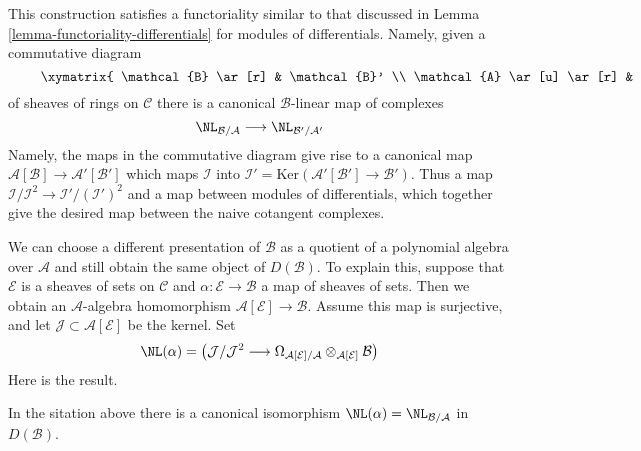 \noindent
This construction satisfies a functoriality similar to that discussed
in Lemma \ref{lemma-functoriality-differentials} for modules of differentials.
Namely, given a commutative diagram
\begin{equation}
\label{equation-commutative-square-sheaves}
\vcenter{
\xymatrix{
\mathcal{B} \ar[r] & \mathcal{B}' \\
\mathcal{A} \ar[u] \ar[r] & \mathcal{A}' \ar[u]
}
}
\end{equation}
of sheaves of rings on $\mathcal{C}$ there is a canonical
$\mathcal{B}$-linear map of complexes
$$
\NL_{\mathcal{B}/\mathcal{A}} \longrightarrow \NL_{\mathcal{B}'/\mathcal{A}'}
$$
Namely, the maps in the commutative diagram give rise to a canonical map
$\mathcal{A}[\mathcal{B}] \to \mathcal{A}'[\mathcal{B}']$
which maps $\mathcal{I}$ into
$\mathcal{I}' = \text{Ker}(\mathcal{A}'[\mathcal{B}'] \to \mathcal{B}')$.
Thus a map $\mathcal{I}/\mathcal{I}^2 \to \mathcal{I}'/(\mathcal{I}')^2$
and a map between modules of differentials, which together give the
desired map between the naive cotangent complexes.

\medskip\noindent
We can choose a different presentation of $\mathcal{B}$ as a quotient of a
polynomial algebra over $\mathcal{A}$ and still obtain the same object
of $D(\mathcal{B})$. To explain this, suppose that $\mathcal{E}$ is
a sheaves of sets on $\mathcal{C}$ and $\alpha : \mathcal{E} \to \mathcal{B}$
a map of sheaves of sets. Then we obtain an $\mathcal{A}$-algebra
homomorphism $\mathcal{A}[\mathcal{E}] \to \mathcal{B}$. Assume this map
is surjective, and let $\mathcal{J} \subset \mathcal{A}[\mathcal{E}]$
be the kernel. Set
$$
\NL(\alpha) = \left(
\mathcal{J}/\mathcal{J}^2
\longrightarrow
\Omega_{\mathcal{A}[\mathcal{E}]/\mathcal{A}}
\otimes_{\mathcal{A}[\mathcal{E}]} \mathcal{B}\right)
$$
Here is the result.

\begin{lemma}
\label{lemma-NL-up-to-qis}
In the sitation above there is a canonical isomorphism
$\NL(\alpha) = \NL_{\mathcal{B}/\mathcal{A}}$ in $D(\mathcal{B})$.
\end{lemma}

